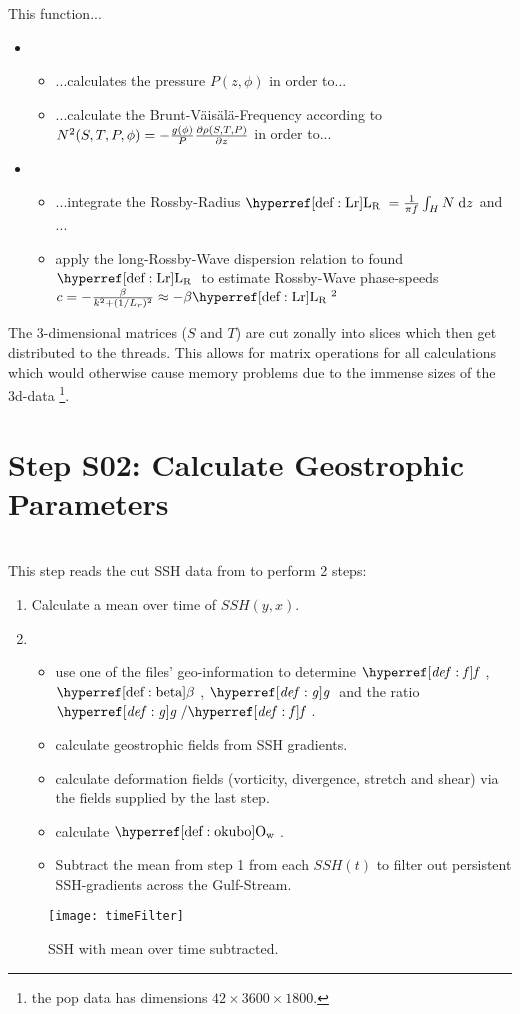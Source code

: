 This function...
\begin{itemize}
	\item
	\begin{itemize}
		\item
		...calculates the pressure $P(z,\phi)$ in order to...
		\item
		...calculate the Brunt-V\"ais\"al\"a-Frequency according to $N^{2}(S,T,P,\phi)=-\frac{g(\phi)}{P} \frac{\partial \rho(S,T,P)}{\partial z}$
		in order to...
	\end{itemize}
	\item
	\begin{itemize}
		\item
		...integrate the Rossby-Radius $\Lr=\frac{1}{\pi f}\INT{H}{ }{N}{z}$ and ...
		\item
		apply the long-Rossby-Wave dispersion relation to found $\Lr$ to estimate Rossby-Wave phase-speeds $c=-\frac{\beta}{k^2+(1/L_r)^2} \approx -\beta \Lr^2$
	\end{itemize}
\end{itemize}

The 3-dimensional matrices ($S$ and $T$) are cut zonally into slices which then get distributed to the threads. This allows for matrix operations for all calculations which would otherwise cause memory problems due to the immense sizes of the 3d-data \footnote{\Eg the pop data has dimensions $42 \times 3600 \times 1800 $.}.
\section{Step S02: Calculate Geostrophic Parameters}
\\
This step reads the cut SSH data from  to perform 2 steps:
\begin{enumerate}
\item
Calculate a mean over time of $SSH(y,x)$.
	\item
\begin{itemize}
	\item  use one of the files' geo-information to determine $\f$, $\dfdy$,
$\g$ and the ratio $\g/\f$.
\item
 calculate geostrophic fields from SSH gradients.
 \item
 calculate deformation fields (vorticity, divergence, stretch and shear) via the
fields supplied by the last step.
\item calculate $\okubo$.
\item
Subtract the mean from step 1 from each $SSH(t)$ to filter out persistent SSH-gradients \eg across the Gulf-Stream.
\end{itemize}
\end{enumerate}
\begin{figure}
	\texttt{[image: timeFilter]}
	\caption{SSH with mean over time subtracted.}
	\label{fig:timeFilter}
\end{figure}
